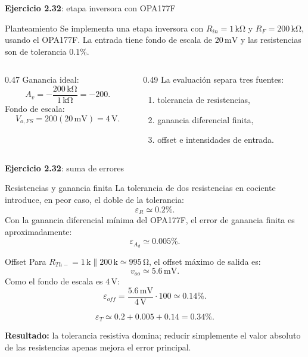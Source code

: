 \documentclass[aspectratio=169,9pt]{beamer}
\newcommand{\exercise}[1]{\textbf{Ejercicio #1}}
\newcommand{\result}[1]{\textbf{\color{eiTeal}Resultado:} #1}
\newcommand{\unit}[1]{\,\mathrm{#1}}
\begin{document}
\begin{frame}{\exercise{2.32}: etapa inversora con OPA177F}
  \begin{block}{Planteamiento}
    Se implementa una etapa inversora con \(R_{in}=1\unit{k\Omega}\) y \(R_F=200\unit{k\Omega}\), usando el OPA177F. La entrada tiene fondo de escala de \(20\unit{mV}\) y las resistencias son de tolerancia \(0.1\%\).
  \end{block}

  \begin{columns}[T,onlytextwidth]
    \begin{column}{0.47\textwidth}
      Ganancia ideal:
      \[
        A_v=-\frac{200\unit{k\Omega}}{1\unit{k\Omega}}=-200.
      \]
      Fondo de escala:
      \[
        V_{o,FS}=200(20\unit{mV})=4\unit{V}.
      \]
    \end{column}
    \begin{column}{0.49\textwidth}
      La evaluación separa tres fuentes:
      \begin{enumerate}
        \item tolerancia de resistencias,
        \item ganancia diferencial finita,
        \item offset e intensidades de entrada.
      \end{enumerate}
    \end{column}
  \end{columns}
\end{frame}

\begin{frame}[shrink=25]{\exercise{2.32}: suma de errores}
  \begin{block}{Resistencias y ganancia finita}
    La tolerancia de dos resistencias en cociente introduce, en peor caso, el doble de la tolerancia:
    \[
      \varepsilon_R \simeq 0.2\%.
    \]
    Con la ganancia diferencial mínima del OPA177F, el error de ganancia finita es aproximadamente:
    \[
      \varepsilon_{A_d}\simeq 0.005\%.
    \]
  \end{block}

  \begin{block}{Offset}
    Para \(R_{Th-}=1\unit{k}\parallel 200\unit{k}\simeq 995\unit{\Omega}\), el offset máximo de salida es:
    \[
      v_{oo}\simeq 5.6\unit{mV}.
    \]
    Como el fondo de escala es \(4\unit{V}\):
    \[
      \varepsilon_{off}=\frac{5.6\unit{mV}}{4\unit{V}}\cdot100\simeq 0.14\%.
    \]
  \end{block}

  \[
    \varepsilon_T\simeq 0.2+0.005+0.14=0.34\%.
  \]

  \result{la tolerancia resistiva domina; reducir simplemente el valor absoluto de las resistencias apenas mejora el error principal.}
\end{frame}
\end{document}
